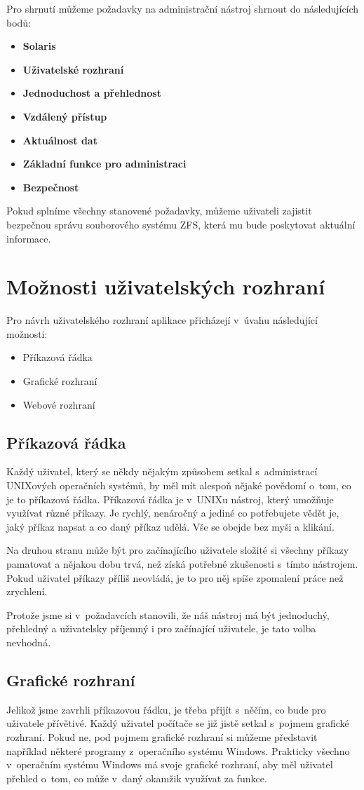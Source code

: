 Pro shrnutí můžeme požadavky na administrační nástroj shrnout do následujících bodů:
\begin{itemize}
    \item \textbf{Solaris}
    \item \textbf{Uživatelské rozhraní}
    \item \textbf{Jednoduchost a přehlednost}
    \item \textbf{Vzdálený přístup}
    \item \textbf{Aktuálnost dat}
    \item \textbf{Základní funkce pro administraci}
    \item \textbf{Bezpečnost}
\end{itemize}

Pokud splníme všechny stanovené požadavky, můžeme uživateli zajistit bezpečnou správu souborového systému ZFS, která mu bude poskytovat aktuální informace.
\section{Možnosti uživatelských rozhraní}
Pro návrh uživatelského rozhraní aplikace přicházejí v~úvahu následující možnosti:
\begin{itemize}
  \item Příkazová řádka
  \item Grafické rozhraní
  \item Webové rozhraní
\end{itemize}
    \subsection{Příkazová řádka}
    Každý uživatel, který se někdy nějakým způsobem setkal s~administrací UNIXových operačních systémů, by měl mít alespoň nějaké povědomí o~tom, co je to příkazová řádka. Příkazová řádka je v~UNIXu nástroj, který umožňuje využívat různé příkazy. Je rychlý, nenáročný a jediné co potřebujete vědět je, jaký příkaz napsat a co daný příkaz udělá. Vše se obejde bez myši a klikání.

    Na druhou stranu může být pro začínajícího uživatele složité si všechny příkazy pamatovat a nějakou dobu trvá, než získá potřebné zkušenosti s~tímto nástrojem. Pokud uživatel příkazy příliš neovládá, je to pro něj spíše zpomalení práce než zrychlení.

    Protože jsme si v~požadavcích stanovili, že náš nástroj má být jednoduchý, přehledný a uživatelsky příjemný i pro začínající uživatele, je tato volba nevhodná.
    \subsection{Grafické rozhraní}
    Jelikož jsme zavrhli příkazovou řádku, je třeba přijít s~něčím, co bude pro uživatele přívětivé. Každý uživatel počítače se již jistě setkal s~pojmem grafické rozhraní. Pokud ne, pod pojmem grafické rozhraní si můžeme představit například některé programy z~operačního systému Windows. Prakticky všechno v~operačním systému Windows má svoje grafické rozhraní, aby měl uživatel přehled o~tom, co může v~daný okamžik využívat za funkce.

